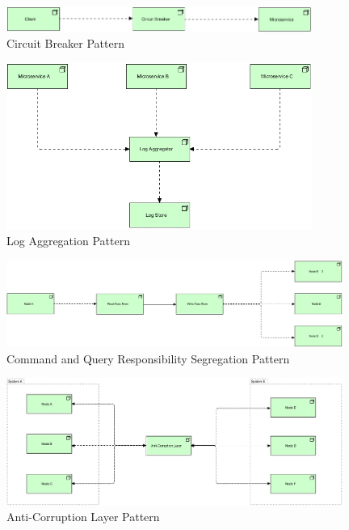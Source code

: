 \documentclass{bmcart}
\begin{document}
\begin{backmatter}
\begin{figure}[h]
  \includegraphics[width=10cm]{Media/Circuit Breaker.jpg}
  \caption{Circuit Breaker Pattern}
  \label{circuitBreaker}
\end{figure}

\begin{figure}[h]
  \includegraphics[width=10cm]{Media/Log Aggregation Pattern.jpg}
  \caption{Log Aggregation Pattern}
  \label{logAggregation}
\end{figure}

\begin{figure}[h]
  \includegraphics[width=11cm]{Media/Command and Query Responsibility Segregation.jpg}
  \caption{Command and Query Responsibility Segregation Pattern}
  \label{CQRS}
\end{figure}

\begin{figure}[h]
  \includegraphics[width=11cm]{Media/Anti-Corruption Layer.jpg}
  \caption{Anti-Corruption Layer Pattern}
  \label{antiCorruption}
\end{figure}


\end{backmatter}
\end{document}
